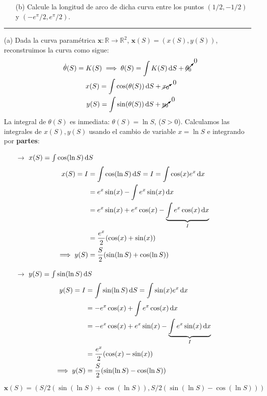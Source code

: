 \begin{enumerate}
\begin{enumerate}
        \item[(b)] Calcule la longitud de arco de dicha curva entre los puntos $(1/2,-1/2)$ y $(-e^\pi/2,e^\pi/2)$.
    \end{enumerate}
    \noindent\rule{\textwidth}{0.5pt}
    (a) Dada la curva paramétrica $\mathbf{x}:\mathbb{R}\longrightarrow \mathbb{R}^2$, $\mathbf{x}(S)=(x(S),y(S))$, reconstruimos la curva como sigue:
    \begin{gather*}
        \dot{\theta}(S)=K(S)\implies \theta(S)=\int K(S) \odif{S} + \cancelto{0}{\theta_0}\\
        x(S)=\int \cos(\theta(S)) \odif{S} + \cancelto{0}{x_0} \\
        y(S)=\int \sin(\theta(S)) \odif{S} + \cancelto{0}{y_0}
    \end{gather*}
    La integral de $\theta(S)$ es inmediata: $\theta(S)=\ln{S}$, ($S>0$).
    Calculamos las integrales de $x(S),y(S)$ usando el cambio de variable $x=\ln{S}$ e integrando por \textbf{partes}:
    \begin{enumerate}
        \item[$\rightarrow$] $x(S)=\int \cos(\ln{S}) \odif{S}$
        \begin{equation*}
            \begin{split}
               x(S)=I&=\int \cos(\ln{S}) \odif{S}=I=\int \cos(x)e^x \odif{x} \\
                     &=e^x\sin(x)-\int e^x \sin(x) \odif{x}\\
                     &=e^x\sin(x)+e^x\cos(x)-\underbrace{\int e^x \cos(x) \odif{x}}_{I}\\
                     &=\frac{e^x}{2}(\cos(x)+\sin(x))\\
        \implies y(S)&=\frac{S}{2}(\sin(\ln{S})+\cos(\ln{S}))
            \end{split}
        \end{equation*}
        \item[$\rightarrow$] $y(S)=\int \sin(\ln{S}) \odif{S}$
        \begin{equation*}
            \begin{split}
               y(S)=I&=\int \sin(\ln{S}) \odif{S}=\int \sin(x)e^x \odif{x} \\
                     &=-e^x\cos(x)+\int e^x \cos(x) \odif{x}\\
                     &=-e^x\cos(x)+e^x\sin(x)-\underbrace{\int e^x \sin(x) \odif{x}}_{I}\\
                     &=\frac{e^x}{2}(\cos(x)-\sin(x))\\
        \implies y(S)&=\frac{S}{2}(\sin(\ln{S})-\cos(\ln{S}))
            \end{split}
        \end{equation*}
    \end{enumerate}
        $$
        \boxed{\mathbf{x}(S)=(S/2(\sin(\ln{S})+\cos(\ln{S})),S/2(\sin(\ln{S})-\cos(\ln{S})))}
        $$


\end{enumerate}
